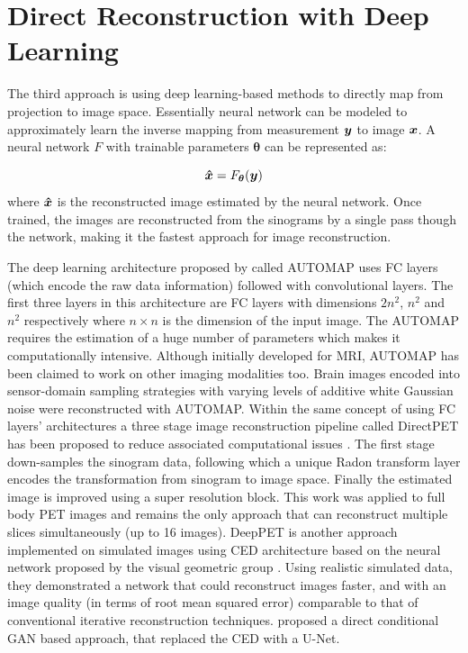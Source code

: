 \section{Direct Reconstruction with Deep Learning}

The third approach is using deep learning-based methods to directly map from projection to image space. Essentially neural network can be modeled to approximately learn the inverse mapping from measurement $\bm{y}$ to image $\bm{x}$. A neural network $F$ with trainable parameters $\bm{\theta}$ can be represented as:

\begin{equation}\label{eq:direct}
\bm{\hat{x}}=F_{\bm{\theta}}(\bm{y})
\end{equation}
where $\bm{\hat{x}}$ is the reconstructed image estimated by the neural network. Once trained, the images are reconstructed from the sinograms by a single pass though the network, making it the fastest approach for image reconstruction. 

The deep learning architecture proposed by \cite{zhu2018image} called AUTOMAP uses \ac{FC} layers (which encode the raw data information) followed with convolutional layers. The first three layers in this architecture are \ac{FC} layers with dimensions $2n^2$, $n^2$ and $n^2$ respectively where $n\times{}n$ is the dimension of the input image. The AUTOMAP requires the estimation of a huge number of parameters which makes it computationally intensive. Although initially developed for \ac{MRI}, AUTOMAP has been claimed to work on other imaging modalities too. Brain images encoded into sensor-domain sampling strategies with varying levels of additive white Gaussian noise were reconstructed with AUTOMAP.  Within the same concept of using \ac{FC} layers' architectures a three stage image reconstruction pipeline called DirectPET has been proposed to reduce associated computational issues  \cite{whiteley2019direct}. The first stage down-samples the sinogram data, following which a unique Radon transform layer encodes the transformation from sinogram to image space. Finally the estimated image is improved using a super resolution block. This work was applied to full body \ac{PET} images and remains the only approach that can reconstruct multiple slices simultaneously (up to 16 images). DeepPET is another approach implemented on simulated images using \ac{CED} architecture based on the neural network proposed by the visual geometric group \cite{haeggstroem2018deeprec}. Using realistic simulated data, they demonstrated a network that could reconstruct images faster, and with an image quality (in terms of root mean squared error) comparable to that of conventional iterative reconstruction techniques. \cite{liu2019deep} proposed a direct conditional \ac{GAN} based approach, that replaced the \ac{CED} with a U-Net.    


